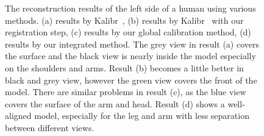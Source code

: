 \begin{figure}[htbp]
{\begin{minipage}[c]{.22\linewidth}
\end{minipage}
}
\caption{The reconstruction results of the left side of a human using various methods. (a) results by Kalibr~\cite{Maye2013Self}, (b) results by Kalibr~\cite{Maye2013Self} with our registration step, (c) results by our global calibration method, (d) results by our integrated method. The grey view in result (a) covers the surface and the black view is nearly inside the model especially on the shoulders and arms. Result (b) becomes a little better in black and grey view, however the green view covers the front of the model. There are similar problems in result (c), as the blue view covers the surface of the arm and head. Result (d) shows a well-aligned model, especially for the leg and arm with less separation between different views.}
\label{fig:pointcloud1}
\end{figure}

